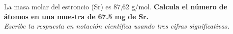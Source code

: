 La masa molar del estroncio (Sr) es 87,62 g/mol.
\textbf{Calcula el número de átomos en una muestra de 67.5 mg de Sr.}\\
\emph{Escribe tu respuesta en notación científica usando tres cifras significativas.}